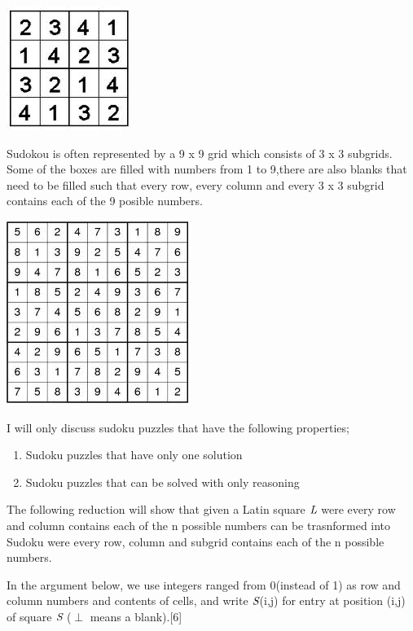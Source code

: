 \documentclass[a4paper]{report}
\begin{document}
\begin{center}
\includegraphics[scale=0.60]{sudoku.png}
\end{center}

\vspace{3mm}
Sudokou is often represented by a 9 x 9 grid which consists of 3 x 3 subgrids. Some of the boxes are filled with numbers from 1 to 9,there are also blanks that need to be filled such that every row, every column and every 3 x 3 subgrid contains each of the 9 posible numbers.

\begin{center}
\includegraphics[scale=0.60]{9x9sud.png}
\end{center}

I will only discuss sudoku puzzles that have the following properties;

\begin{enumerate}
\item
Sudoku puzzles that have only one solution
\item
Sudoku puzzles that can be solved with only reasoning 
\end{enumerate}

The following reduction will show that given a Latin square $\emph{L}$ were every row and column contains each of the n possible numbers can be trasnformed into Sudoku were every row, column and subgrid contains each of the n possible numbers.

\vspace{3mm}
In the argument below, we use integers ranged from 0(instead of 1) as row and column numbers and contents of cells, and write $\emph{S}$(i,j) for entry at position (i,j) of square $\emph{S}$ ($\perp$ means a blank).[6]
\end{document}
